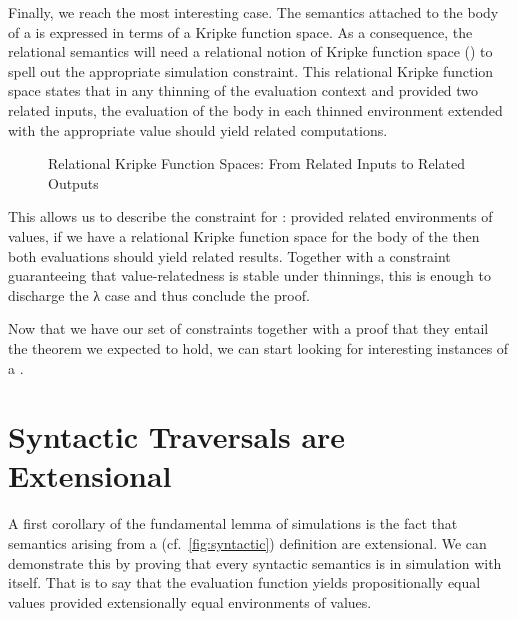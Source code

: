 Finally, we reach the most interesting case. The semantics attached to the
body of a  is expressed in terms of a Kripke function space. As
a consequence, the relational semantics will need a relational notion of
Kripke function space () to spell out the appropriate simulation
constraint. This relational Kripke function space states that in any
thinning of the evaluation context and provided two related inputs, the
evaluation of the body in each thinned environment extended with the
appropriate value should yield related computations.

\begin{figure}[h]
\caption{Relational Kripke Function Spaces: From Related Inputs to Related Outputs\label{fig:relationalkripke}}
\end{figure}

This allows us to describe the constraint for : provided related
environments of values, if we have a relational Kripke function space for
the body of the  then both evaluations should yield related
results. Together with a constraint guaranteeing that value-relatedness
is stable under thinnings, this is enough to discharge the λ case and thus
conclude the proof.

\begin{AgdaSuppressSpace}
\end{AgdaSuppressSpace}

Now that we have our set of constraints together with a proof that they
entail the theorem we expected to hold, we can start looking for interesting
instances of a .

\section{Syntactic Traversals are Extensional}

A first corollary of the fundamental lemma of simulations is the fact that semantics
arising from a  (cf.~\cref{fig:syntactic}) definition are extensional. We
can demonstrate this by proving that every syntactic semantics is in simulation with
itself. That is to say that the evaluation function yields propositionally equal
values provided extensionally equal environments of values.


